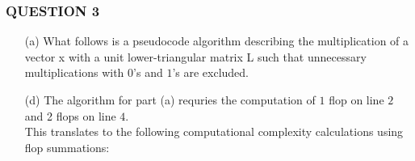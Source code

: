 \documentclass{article}
\begin{document}
\subsubsection*{QUESTION 3}

\vspace{10pt}

\begin{enumerate}

    \item[(a)]  What follows is a pseudocode algorithm describing the
                multiplication of a vector x with a unit lower-triangular
                matrix L such that unnecessary multiplications with $0$'s and $1$'s are
                excluded.
     
                \begin{algorithm}[H]
                    \LinesNumbered
                \end{algorithm}
                \pagebreak

    \item[(d)]  The algorithm for part (a) requries the computation of $1$ flop on line $2$ and 2 flops on line $4$.\\
                This translates to the following computational complexity calculations using flop summations:


\end{enumerate}
\end{document}
